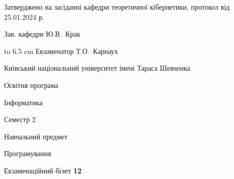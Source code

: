 \documentclass[12pt, ukrainian]{article}
\begin{document}
{\smallskip\smallskip \begin {scriptsize} Затверджено на засіданні кафедри теоретичної кібернетики, протокол   від   25.01.2024 р.\par\smallskip\smallskip\smallskip\smallskip
{\parbox {6.5 cm} {Зав. кафедри \dotfill Ю.В.~Крак}}\hspace {0.7cm} {\hbox to 6.5 cm { Екзаменатор \dotfill Т.О.~Карнаух}} \end{scriptsize}}
\newpage
{{\begin {scriptsize}\par
{ \center  Київський національний університет імені Тараса Шевченка \par}
{\parbox {5 cm}{Освітня програма \hfill}{\parbox {7 cm}{Інформатика\hfill}}\parbox {6 cm}{\hfill Семестр 2}}\par
{\parbox {5 cm} {Навчальний предмет \hfill}\parbox {7 cm}{Програмування \hfill}\parbox {6cm}{\hfill}\par}\vspace{-15pt} \end{scriptsize}}{\center Екзаменаційний білет \No \textbf { 12 }\par}}
\end{document}
